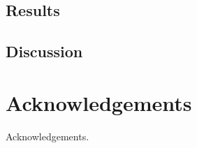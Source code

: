 \documentclass[parskip=full, numbers=noenddot]{scrreprt}
\begin{document}

\section{Results}
\label{sec:pcrbias_results}

\section{Discussion}
\label{sec:pcrbias_discussion}

\chapter{Acknowledgements}
\label{ch:ack}

Acknowledgements.

\printbibliography
\end{document}
